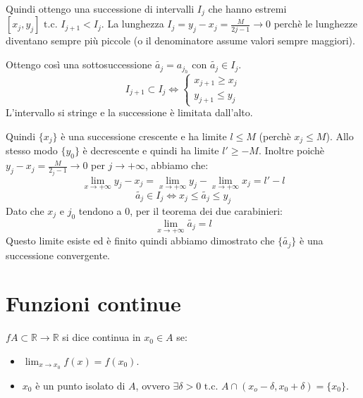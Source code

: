 \begin{dimostration}
Quindi ottengo una successione di intervalli $I_j$ che hanno estremi $[x_j,y_j]\text{ t.c. }I_{j+1}<I_j$. La lunghezza $I_j=y_j-x_j=\frac{M}{2j-1}\rightarrow 0$ perchè le lunghezze diventano sempre più piccole (o il denominatore assume valori sempre maggiori).

Ottengo così una sottosuccessione $\widetilde{a_j}=a_{j_h}\text{ con }\widetilde{a_j}\in I_j$.
\begin{equation*}
    I_{j+1}\subset I_j \iff \begin{cases}
    x_{j+1} \geq x_j\\
    y_{j+1} \leq y_j
    \end{cases}
\end{equation*}
L'intervallo si stringe e la successione è limitata dall'alto.

Quindi $\{x_j\}$ è una successione crescente e ha limite $l\leq M$ (perchè $x_j\leq M$). Allo stesso modo $\{y_0\}$ è decrescente e quindi ha limite $l'\geq -M$. Inoltre poichè $y_j-x_j=\frac{M}{2_j-1}\rightarrow 0$ per $j\to+\infty$, abbiamo che:
\begin{equation*}
    \lim_{x\to+\infty}y_j-x_j=\lim_{x\to+\infty}y_j-\lim_{x\to+\infty}x_j=l'-l
\end{equation*}
\begin{equation*}
    \widetilde{a_j}\in I_j \iff x_j\leq \widetilde{a_j}\leq y_j
\end{equation*}
Dato che $x_j$ e $j_0$ tendono a 0, per il teorema dei due carabinieri:
\begin{equation*}
    \lim_{x\to+\infty}\widetilde{a_j}=l
\end{equation*}
Questo limite esiste ed è finito quindi abbiamo dimostrato che $\{\widetilde{a_j}\}$ è una successione convergente.\flushright{$\blacksquare$}
\end{dimostration}



\section{Funzioni continue}
\begin{definition}
    $f A\subset\mathbb{R}\rightarrow\mathbb{R}$ si dice continua in $x_0\in A$ se:
    \begin{itemize}
        \item $\lim_{x\to x_0}f(x)=f(x_0)$.
        \item $x_0$ è un punto isolato di $A$, ovvero $\exists \delta>0 \text{ t.c. }A\cap(x_o-\delta, x_0+\delta)=\{x_0\}$.
    \end{itemize}
\end{definition}

